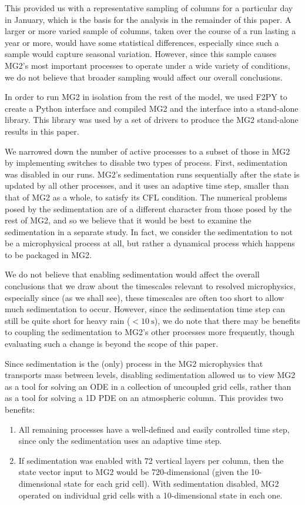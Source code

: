 \documentclass [11pt, proquest] {uwthesis}[2020/02/24]
\begin{document}
This provided us with a representative sampling of columns for a particular day in January, which is the basis for the analysis in the remainder of this paper. A larger or more varied sample of columns, taken over the course of a run lasting a year or more, would have some statistical differences, especially since such a sample would capture seasonal variation. However, since this sample causes MG2's most important processes to operate under a wide variety of conditions, we do not believe that broader sampling would affect our overall conclusions.

In order to run MG2 in isolation from the rest of the model, we used F2PY to create a Python interface and compiled MG2 and the interface into a stand-alone library. This library was used by a set of drivers to produce the MG2 stand-alone results in this paper.

We narrowed down the number of active processes to a subset of those in MG2 by implementing switches to disable two types of process. First, sedimentation was disabled in our runs. MG2's sedimentation runs sequentially after the state is updated by all other processes, and it uses an adaptive time step, smaller than that of MG2 as a whole, to satisfy its CFL condition. The numerical problems posed by the sedimentation are of a different character from those posed by the rest of MG2, and so we believe that it would be best to examine the sedimentation in a separate study. In fact, we consider the sedimentation to not be a microphysical process at all, but rather a dynamical process which happens to be packaged in MG2.

We do not believe that enabling sedimentation would affect the overall conclusions that we draw about the timescales relevant to resolved microphysics, especially since (as we shall see), these timescales are often too short to allow much sedimentation to occur. However, since the sedimentation time step can still be quite short for heavy rain ($<\SI{10}{\second}$), we do note that there may be benefits to coupling the sedimentation to MG2's other processes more frequently, though evaluating such a change is beyond the scope of this paper.

Since sedimentation is the (only) process in the MG2 microphysics that transports mass between levels, disabling sedimentation allowed us to view MG2 as a tool for solving an ODE in a collection of uncoupled grid cells, rather than as a tool for solving a 1D PDE on an atmospheric column. This provides two benefits:
\begin{enumerate}
\item All remaining processes have a well-defined and easily controlled time step, since only the sedimentation uses an adaptive time step.
\item If sedimentation was enabled with \num{72} vertical layers per column, then the state vector input to MG2 would be \num{720}-dimensional (given the \num{10}-dimensional state for each grid cell). With sedimentation disabled, MG2 operated on individual grid cells with a \num{10}-dimensional state in each one.
\end{enumerate}
\end{document}
